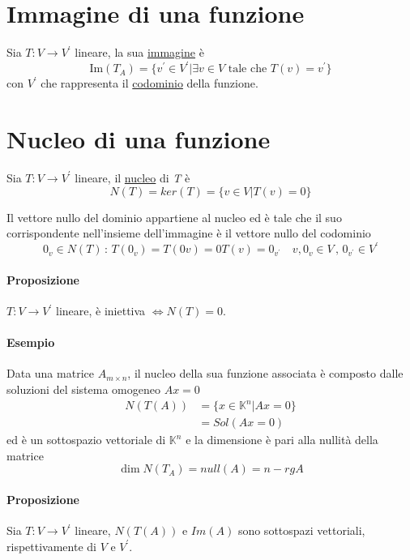 	\section{Immagine di una funzione}
		Sia $T: V \rightarrow V^\prime$ lineare, la sua \underline{immagine} è 
		$$\text{Im} (T_A) = \{ v^\prime \in V^\prime \vert \exists v \in V \text{ tale che } T(v) = v^\prime \}$$
		con $V^\prime$ che rappresenta il \underline{codominio} della funzione.
	
	\section{Nucleo di una funzione}
		Sia $T: V \rightarrow V^\prime$ lineare, il \underline{nucleo} di \textit{T} è
		$$N(T) = ker (T) = \{ v \in V \vert T(v) = 0 \}$$
		
		Il vettore nullo del dominio appartiene al nucleo ed è tale che il suo corrispondente nell'insieme dell'immagine è il vettore nullo del codominio
		$$0_v \in N(T) \, : \, T(0_v) = T (0v) = 0 T(v) = 0_{v^\prime} \quad v, 0_v \in V \, , \, 0_{v^\prime} \in V^\prime$$
		
		\paragraph{Proposizione}
		$T: V \rightarrow V^\prime$ lineare, è iniettiva $\iff N(T) = {0}$.
		
		\begin{GrayBox}
			\paragraph{Esempio} Data una matrice $A_{m \times n}$, il nucleo della sua funzione associata è composto dalle soluzioni del sistema omogeneo $A x = 0$ 
			\begin{equation*}
				\begin{split}
					N(T(A)) &= \{ x \in \mathbb{K}^n \vert Ax = 0 \} \\
					&= Sol (Ax = 0)
				\end{split}
			\end{equation*}
			ed è un sottospazio vettoriale di $\mathbb{K}^n$ e la dimensione è pari alla nullità della matrice
			$$\dim N(T_A) = null (A) = n - rg A$$
		\end{GrayBox}
		
		\paragraph{Proposizione}
		Sia $T: V \rightarrow V^\prime$ lineare,
		$N(T(A))$ e $Im(A)$ sono sottospazi vettoriali, rispettivamente di $V$ e $V^\prime$.
		

